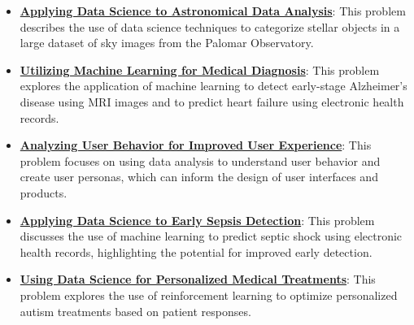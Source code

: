 \documentclass{article}%
\begin{document}
\begin{itemize}[leftmargin=*]
\item \href{https://purdue.brightspace.com/d2l/common/assets/pdfjs-d2l-dist/1.0.14-legacy/web/viewer.html?file=\%2Fcontent\%2Fenforced\%2F1095465-WL.202510.CS24200.LE1\%2F02L1-datas-intro.pdf\%3Fou\%3D1095465\&lang=en-us\&container=d2l-fileviewer-rendered-pdf\&fullscreen=d2l-fileviewer-rendered-pdf-dialog\&height=667#page=15}{\textbf{Applying Data Science to Astronomical Data Analysis}}: This problem describes the use of data science techniques to categorize stellar objects in a large dataset of sky images from the Palomar Observatory.%
\item \href{https://purdue.brightspace.com/d2l/common/assets/pdfjs-d2l-dist/1.0.14-legacy/web/viewer.html?file=\%2Fcontent\%2Fenforced\%2F1095465-WL.202510.CS24200.LE1\%2F02L1-datas-intro.pdf\%3Fou\%3D1095465\&lang=en-us\&container=d2l-fileviewer-rendered-pdf\&fullscreen=d2l-fileviewer-rendered-pdf-dialog\&height=667#page=16}{\textbf{Utilizing Machine Learning for Medical Diagnosis}}: This problem explores the application of machine learning to detect early-stage Alzheimer's disease using MRI images and to predict heart failure using electronic health records.%
\item \href{https://purdue.brightspace.com/d2l/common/assets/pdfjs-d2l-dist/1.0.14-legacy/web/viewer.html?file=\%2Fcontent\%2Fenforced\%2F1095465-WL.202510.CS24200.LE1\%2F02L1-datas-intro.pdf\%3Fou\%3D1095465\&lang=en-us\&container=d2l-fileviewer-rendered-pdf\&fullscreen=d2l-fileviewer-rendered-pdf-dialog\&height=667#page=18}{\textbf{Analyzing User Behavior for Improved User Experience}}: This problem focuses on using data analysis to understand user behavior and create user personas, which can inform the design of user interfaces and products.%
\item \href{https://purdue.brightspace.com/d2l/common/assets/pdfjs-d2l-dist/1.0.14-legacy/web/viewer.html?file=\%2Fcontent\%2Fenforced\%2F1095465-WL.202510.CS24200.LE1\%2F02L1-datas-intro.pdf\%3Fou\%3D1095465\&lang=en-us\&container=d2l-fileviewer-rendered-pdf\&fullscreen=d2l-fileviewer-rendered-pdf-dialog\&height=667#page=19}{\textbf{Applying Data Science to Early Sepsis Detection}}: This problem discusses the use of machine learning to predict septic shock using electronic health records, highlighting the potential for improved early detection.%
\item \href{https://purdue.brightspace.com/d2l/common/assets/pdfjs-d2l-dist/1.0.14-legacy/web/viewer.html?file=\%2Fcontent\%2Fenforced\%2F1095465-WL.202510.CS24200.LE1\%2F02L1-datas-intro.pdf\%3Fou\%3D1095465\&lang=en-us\&container=d2l-fileviewer-rendered-pdf\&fullscreen=d2l-fileviewer-rendered-pdf-dialog\&height=667#page=20}{\textbf{Using Data Science for Personalized Medical Treatments}}: This problem explores the use of reinforcement learning to optimize personalized autism treatments based on patient responses.%

\end{itemize}
\end{document}
